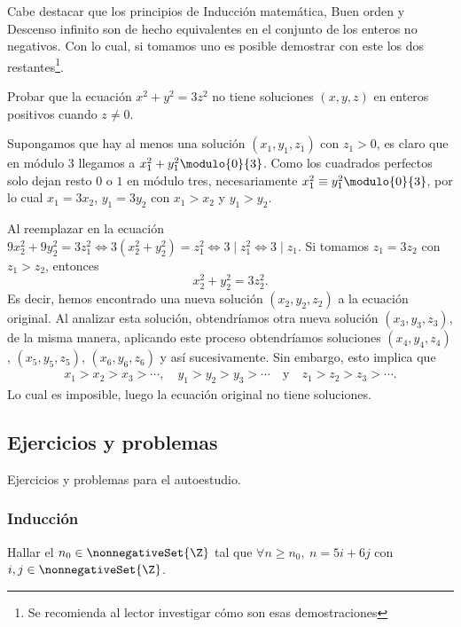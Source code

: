 Cabe destacar que los principios de Inducción matemática, Buen orden y Descenso infinito son de hecho equivalentes en
el conjunto de los enteros no negativos.
Con lo cual, si tomamos uno es posible demostrar con este los dos restantes\footnote{Se recomienda al lector investigar cómo son esas demostraciones}.

\begin{example}
    Probar que la ecuación $x^2 + y^2 = 3z^2$ no tiene soluciones $(x,y,z)$ en enteros positivos cuando $z \neq 0$.
\end{example}
\begin{solution}
    Supongamos que hay al menos una solución $(x_1,y_1,z_1)$ con $z_1 > 0$, es claro que en módulo 3 llegamos a $x_1^2+y_1^2 \modulo{0}{3}$.
    Como los cuadrados perfectos solo dejan resto $0$ o $1$ en módulo tres, necesariamente $x_1^2\equiv y_1^2 \modulo{0}{3}$,
    por lo cual $x_1 = 3x_2$, $y_1 = 3y_2$ con $x_1 > x_2$ y $y_1 > y_2$.

    Al reemplazar en la ecuación $9x_2^2+9y_2^2=3z_1^2 \iff 3(x_2^2+y_2^2)=z_1^2 \iff 3 \mid z_1^2 \iff 3 \mid z_1$.
    Si tomamos $z_1 = 3z_2$ con $z_1 > z_2$, entonces
    \[
        x_2^2+y_2^2=3z_2^2.
    \]
    Es decir, hemos encontrado una nueva solución $(x_2,y_2,z_2)$ a la ecuación original.
    Al analizar esta solución, obtendríamos otra nueva solución $(x_3,y_3,z_3)$, de la misma manera, aplicando este proceso
    obtendríamos soluciones $(x_4,y_4,z_4)$, $(x_5,y_5,z_5)$, $(x_6,y_6,z_6)$ y así sucesivamente.
    Sin embargo, esto implica que
    \begin{align*}
        x_1 > x_2 > x_3 > \cdots, \quad
        y_1 > y_2 > y_3 > \cdots \quad \text{y} \quad
        z_1 > z_2 > z_3 > \cdots.
    \end{align*}
    Lo cual es imposible, luego la ecuación original no tiene soluciones.
\end{solution}




\subsection{Ejercicios y problemas}

Ejercicios y problemas para el autoestudio.

\subsubsection{Inducción}
\begin{exercise}
    Hallar el $n_0 \in \nonnegativeSet{\Z}$ tal que $\forall n \geq n_0,\ n = 5i + 6j$ con $i,j \in \nonnegativeSet{\Z}$.
\end{exercise}

